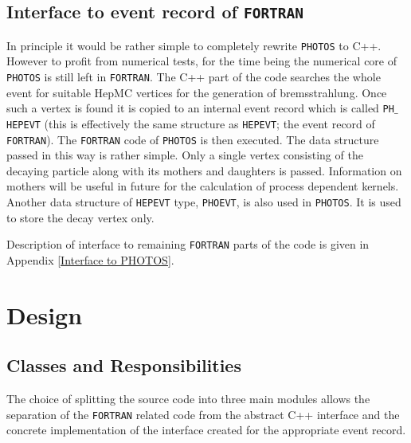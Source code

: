 \documentclass[]{Photos_interface_design}
\begin{document}
\subsection{Interface to event record of {\tt FORTRAN}}
\label{sect:F77fill}

In principle it would be rather simple to completely rewrite {\tt PHOTOS} to
C++. However to profit from numerical tests, for the time being the numerical core of {\tt PHOTOS}
is still left in {\tt FORTRAN}. The C++ part of the code searches the whole event for
suitable HepMC vertices for the generation of bremsstrahlung. Once such
a vertex is found it is copied to an internal event record  which is 
called  {\tt PH$\_$HEPEVT} (this is effectively the same structure as {\tt HEPEVT};
the event record of {\tt FORTRAN}).
The {\tt FORTRAN} code of {\tt PHOTOS} is then executed.
The data structure passed in this way is rather simple. Only a single vertex consisting
of the decaying particle along with its mothers and daughters is passed. Information 
on mothers will be useful in future for the calculation of process dependent 
kernels. Another data structure of   {\tt HEPEVT} type, {\tt PHOEVT}, is also 
used in {\tt PHOTOS}. It is used to store the decay vertex only.  


Description of interface to remaining {\tt FORTRAN} parts of the code is
given in  Appendix \ref{Interface to PHOTOS}.


\section{Design}
\label{sec:design}
\subsection{Classes and Responsibilities}

The choice of splitting the source code into three main modules
 allows the separation of the {\tt FORTRAN} related code from the abstract C++ interface
and the concrete implementation of the interface created for the appropriate
event record.
\end{document}
